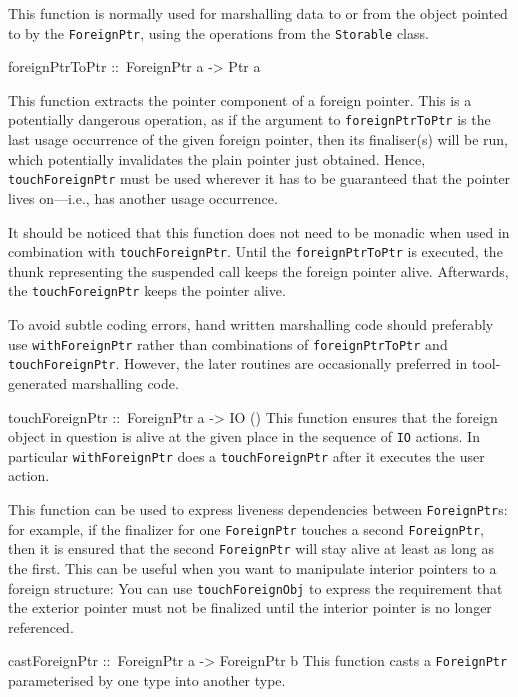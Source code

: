 \documentclass[a4paper,twosides]{article}
\makeatletter
\newcommand{\code}[1]{\texttt{#1}}      %
\newenvironment{codedesc}{%
  \list{}{\labelwidth\z@
    \let\makelabel\codedesclabel}
  }{%
  \endlist
  }
\newcommand*{\codedesclabel}[1]{%
  \hspace{-\leftmargin}
  \parbox[b]{\labelwidth}{\makebox[0pt][l]{\code{#1}}\\}\hfil\relax
  }
\makeatother
\begin{document}
\begin{codedesc}
  This function is normally used for marshalling data to or from the object
  pointed to by the \code{ForeignPtr}, using the operations from the
  \code{Storable} class.

\item[foreignPtrToPtr ::\ ForeignPtr a -> Ptr a]
  
  This function extracts the pointer component of a foreign pointer. This is a
  potentially dangerous operation, as if the argument to
  \code{foreignPtrToPtr} is the last usage occurrence of the given foreign
  pointer, then its finaliser(s) will be run, which potentially invalidates
  the plain pointer just obtained.  Hence, \code{touchForeignPtr} must be used
  wherever it has to be guaranteed that the pointer lives on---i.e., has
  another usage occurrence.

  It should be noticed that this function does not need to be monadic when
  used in combination with \code{touchForeignPtr}.  Until the
  \code{foreignPtrToPtr} is executed, the thunk representing the suspended
  call keeps the foreign pointer alive.  Afterwards, the
  \code{touchForeignPtr} keeps the pointer alive.
  
  To avoid subtle coding errors, hand written marshalling code should
  preferably use \code{withForeignPtr} rather than combinations of
  \code{foreignPtrToPtr} and \code{touchForeignPtr}. However, the later
  routines are occasionally preferred in tool-generated marshalling code.
  
\item[touchForeignPtr ::\ ForeignPtr a -> IO ()] This function ensures that
  the foreign object in question is alive at the given place in the sequence
  of \code{IO} actions. In particular \code{withForeignPtr} does a
  \code{touchForeignPtr} after it executes the user action.
  
  This function can be used to express liveness dependencies between
  \code{ForeignPtr}s: for example, if the finalizer for one \code{ForeignPtr}
  touches a second \code{ForeignPtr}, then it is ensured that the second
  \code{ForeignPtr} will stay alive at least as long as the first. This can be
  useful when you want to manipulate interior pointers to a foreign structure:
  You can use \code{touchForeignObj} to express the requirement that the
  exterior pointer must not be finalized until the interior pointer is no
  longer referenced.
    
\item[castForeignPtr ::\ ForeignPtr a -> ForeignPtr b] This function casts a
  \code{ForeignPtr} parameterised by one type into another type.
\end{codedesc}
\end{document}
